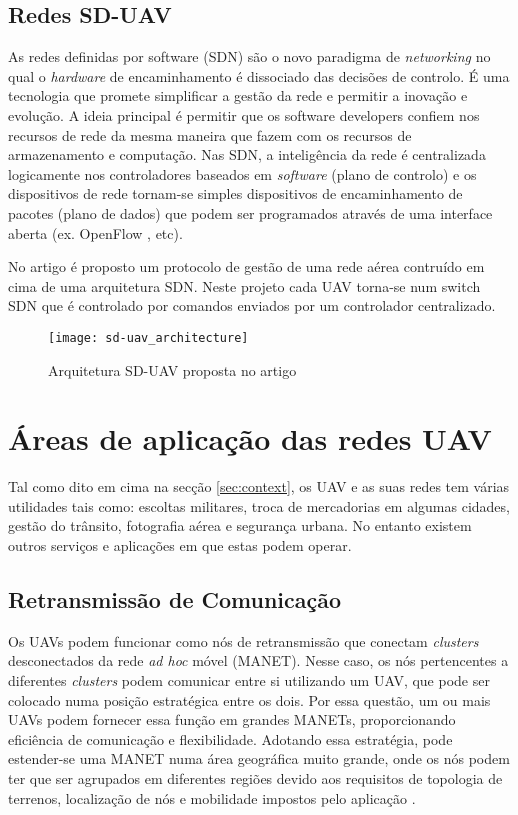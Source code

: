 \subsection{Redes SD-UAV}

As redes definidas por software (SDN) são o novo paradigma de \textit{networking} no qual o \textit{hardware} de encaminhamento é dissociado das decisões de controlo. É uma tecnologia que promete simplificar a gestão da rede e permitir a inovação e evolução. A ideia principal é permitir que os software developers confiem nos recursos de rede da mesma maneira que fazem com os recursos de armazenamento e computação. Nas SDN, a inteligência da rede é centralizada logicamente nos controladores baseados em \textit{software} (plano de controlo) e os dispositivos de rede tornam-se simples dispositivos de encaminhamento de pacotes (plano de dados) que podem ser programados através de uma interface aberta \cite{Nunes2014} (ex. OpenFlow \cite{Leon-Garcia2015}, etc).

No artigo \cite{Secinti2018} é proposto um protocolo de gestão de uma rede aérea contruído em cima de uma arquitetura SDN. Neste projeto cada UAV torna-se num switch SDN que é controlado por comandos enviados por um controlador centralizado.

\begin{figure}[H]
\centering
\texttt{[image: sd-uav\_architecture]}
\caption{Arquitetura SD-UAV proposta no artigo  \label{fig:sd-uav_architecture} }\cite{Secinti2018}
\end{figure}



\section{Áreas de aplicação das redes UAV}\label{sec:application}

Tal como dito em cima na secção \ref{sec:context}, os UAV e as suas redes tem várias utilidades tais como: escoltas militares, troca de mercadorias em algumas cidades, gestão do trânsito, fotografia aérea e segurança urbana. No entanto existem outros serviços e aplicações em que estas podem operar.

\subsection{Retransmissão de Comunicação}

Os UAVs podem funcionar como nós de retransmissão que conectam \textit{clusters} desconectados da rede \textit{ad hoc} móvel (MANET).  Nesse caso, os nós pertencentes a diferentes \textit{clusters} podem comunicar entre si utilizando um UAV, que pode ser colocado numa posição estratégica entre os dois. Por essa questão, um ou mais UAVs podem fornecer essa função em grandes MANETs, proporcionando eficiência de comunicação e flexibilidade. Adotando essa estratégia, pode estender-se uma MANET numa área geográfica muito grande, onde os nós podem ter que ser agrupados em diferentes regiões devido aos requisitos de topologia de terrenos, localização de nós e mobilidade impostos pelo aplicação \cite{ImadJawhar2017}.

